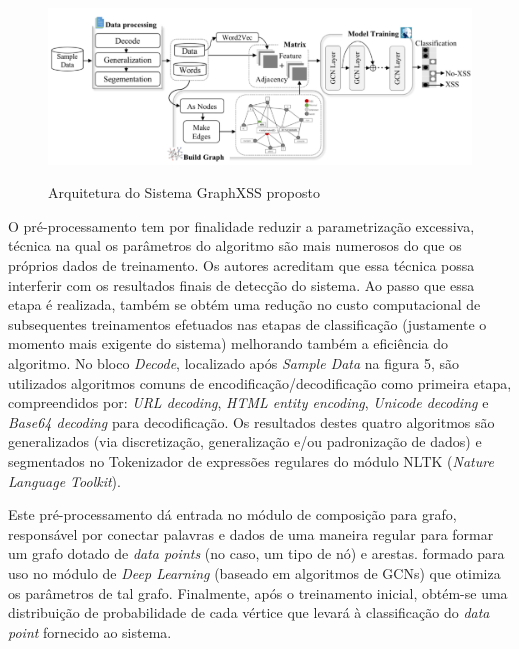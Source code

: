 \begin{figure}[H]
    \centering
    \caption{Arquitetura do Sistema GraphXSS proposto}
    \includegraphics[width=14cm]{figuras/graphXSS.png} 
    \label{fig:internet} 
\end{figure}

O pré-processamento tem por finalidade reduzir a parametrização excessiva, técnica na qual os parâmetros do algoritmo são mais numerosos do que os próprios dados de treinamento. Os autores acreditam que essa técnica possa interferir com os resultados finais de detecção do sistema. Ao passo que essa etapa é realizada, também se obtém uma redução no custo computacional de subsequentes treinamentos  efetuados nas etapas de classificação (justamente o momento mais exigente do sistema) melhorando também a eficiência do algoritmo. No bloco \textit{Decode}, localizado após \textit{Sample Data} na figura 5, são utilizados algoritmos comuns de encodificação/decodificação como primeira etapa, compreendidos por: \textit{URL decoding}, \textit{HTML entity encoding}, \textit{Unicode decoding} e \textit{Base64 decoding} para decodificação. Os resultados destes quatro algoritmos são generalizados (via discretização, generalização e/ou padronização de dados) e segmentados no Tokenizador de expressões regulares do módulo NLTK (\textit{Nature Language Toolkit}).

Este pré-processamento dá entrada no módulo de composição para grafo, responsável por conectar palavras e dados de uma maneira regular para formar um grafo dotado de \textit{data points} (no caso, um tipo de nó) e arestas. formado para uso no módulo de \textit{Deep Learning} (baseado em algoritmos de GCNs) que otimiza os parâmetros de tal grafo. Finalmente, após o treinamento inicial, obtém-se uma distribuição de probabilidade de cada vértice que levará à classificação do \textit{data point} fornecido ao sistema. 

